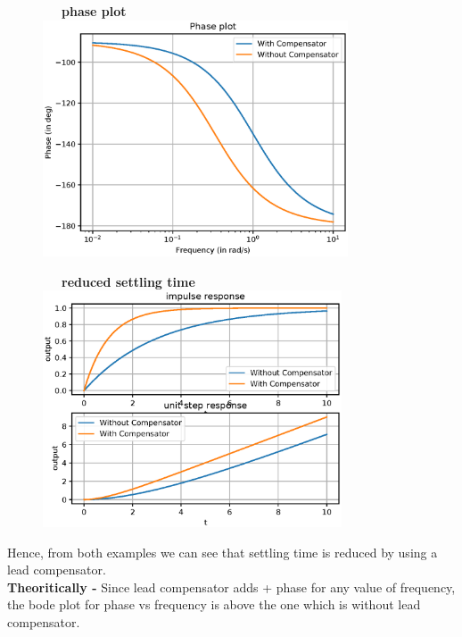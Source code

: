 \begin{enumerate}[label=\thesection.\arabic*.,ref=\thesection.\theenumi]
\begin{figure}
\ \ \ \textbf{phase plot}\\
\includegraphics[width=1\linewidth, height=7cm ,inner]{./figs/ee18btech11027/lead_compensator_phase.eps} 
\label{fig:subim1}
\end{figure}

\begin{figure}
\ \ \ \textbf{reduced settling time}\\
\includegraphics[width=1\linewidth, height=7cm ,inner]{./figs/ee18btech11027/settling_time.eps} 
\label{fig:subim1}
\end{figure}
Hence, from both examples we can see that settling time is reduced by using a lead compensator.\\

\textbf{Theoritically -}
Since lead compensator adds + phase for any value of frequency, the bode plot for phase vs frequency is above the one which is without lead compensator.\\


\end{enumerate}

